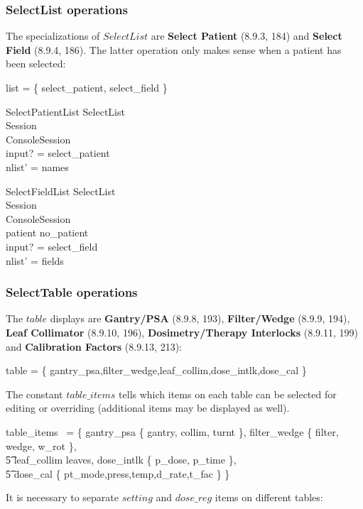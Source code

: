 \documentclass{article}
\begin{document}
\subsubsection{SelectList operations}

The specializations of $SelectList$ are {\bf Select Patient}
(8.9.3, 184) and {\bf Select Field} (8.9.4, 186).  The latter
operation only makes sense when a patient has been selected:

\begin{zed} list = \{ select\_patient, select\_field \} \end{zed}

\begin{schema}{SelectPatientList}
	SelectList \\
	\Xi Session \\
	\Delta ConsoleSession \\
\where
	input? = select\_patient \\
	nlist' = names 
\end{schema}

\begin{schema}{SelectFieldList}
	SelectList \\
	\Xi Session \\
	\Delta ConsoleSession \\
\where
	patient \neq no\_patient \\
	input? = select\_field \\
	nlist' = \dom fields
\end{schema}

\subsubsection{SelectTable operations}

The $table$ displays are {\bf Gantry/PSA} (8.9.8, 193), 
{\bf Filter/Wedge} (8.9.9, 194), {\bf Leaf Collimator} (8.9.10, 196), 
{\bf Dosimetry/Therapy Interlocks} (8.9.11, 199) and 
{\bf Calibration Factors} (8.9.13, 213):

\begin{zed}
table = \{ gantry\_psa,filter\_wedge,leaf\_collim,dose\_intlk,dose\_cal \}
\end{zed}
The constant $table\_items$ tells which items on each table can be
selected for editing or overriding (additional items may be displayed as
well).

\begin{zed}
	table\_items~ = \{ gantry\_psa \mapsto \{ gantry, collim, turnt \}, filter\_wedge \mapsto \{ filter, wedge, w\_rot \}, \\
\t5			leaf\_collim \mapsto leaves, dose\_intlk \mapsto \{ p\_dose, p\_time \}, \\
\t5		dose\_cal \mapsto\{ pt\_mode,press,temp,d\_rate,t\_fac \} \}
\end{zed}
It is necessary to separate $setting$ and $dose\_reg$ items on
different tables:
\end{document}
